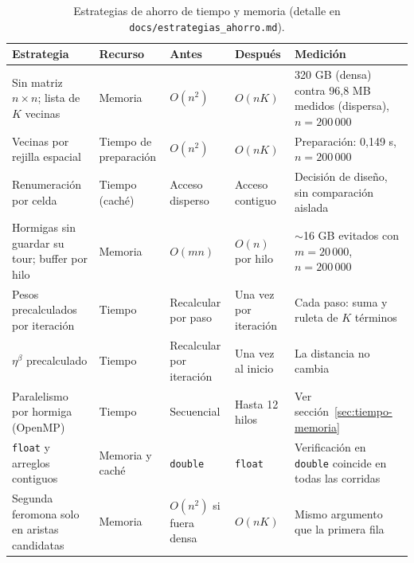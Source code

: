 \begin{table}[H]
\centering
\caption{Estrategias de ahorro de tiempo y memoria (detalle en \texttt{docs/estrategias\_ahorro.md}).}
\label{tab:estrategias}
\footnotesize
\begin{tabular}{p{2.8cm}p{1.4cm}p{1.4cm}p{1.4cm}p{5.1cm}}
\toprule
\rowcolor{gray!25}
\textbf{Estrategia} & \textbf{Recurso} & \textbf{Antes} & \textbf{Después} & \textbf{Medición} \\
\midrule
Sin matriz $n\times n$; lista de $K$ vecinas & Memoria & $O(n^2)$ & $O(nK)$ & 320 GB (densa) contra 96,8 MB medidos (dispersa), $n=200\,000$ \\
Vecinas por rejilla espacial & Tiempo de preparación & $O(n^2)$ & $O(nK)$ & Preparación: 0,149 s, $n=200\,000$ \\
Renumeración por celda & Tiempo (caché) & Acceso disperso & Acceso contiguo & Decisión de diseño, sin comparación aislada \\
Hormigas sin guardar su tour; buffer por hilo & Memoria & $O(mn)$ & $O(n)$ por hilo & $\sim$16 GB evitados con $m=20\,000$, $n=200\,000$ \\
Pesos precalculados por iteración & Tiempo & Recalcular por paso & Una vez por iteración & Cada paso: suma y ruleta de $K$ términos \\
$\eta^\beta$ precalculado & Tiempo & Recalcular por iteración & Una vez al inicio & La distancia no cambia \\
Paralelismo por hormiga (OpenMP) & Tiempo & Secuencial & Hasta 12 hilos & Ver sección~\ref{sec:tiempo-memoria} \\
\texttt{float} y arreglos contiguos & Memoria y caché & \texttt{double} & \texttt{float} & Verificación en \texttt{double} coincide en todas las corridas \\
Segunda feromona solo en aristas candidatas & Memoria & $O(n^2)$ si fuera densa & $O(nK)$ & Mismo argumento que la primera fila \\
\bottomrule
\end{tabular}
\end{table}
